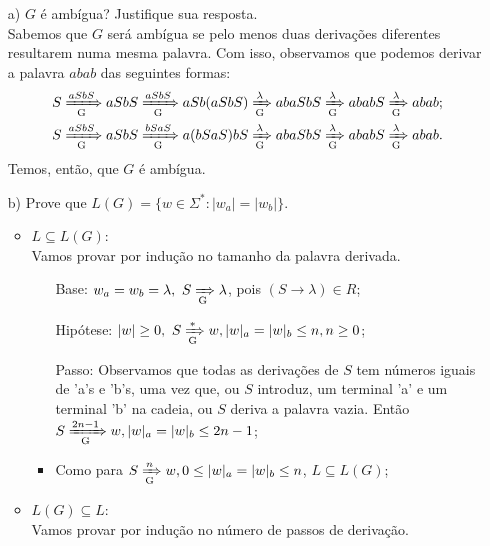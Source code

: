 \documentclass{homework}
\begin{document}
\pagebreak		
		
	\begin{enumerate}
		\item[a)] $G$ é ambígua? Justifique sua resposta.\\
		Sabemos que $G$ será ambígua se pelo menos duas derivações diferentes resultarem numa mesma palavra. Com isso, observamos que podemos derivar a palavra $abab$ das seguintes formas:
		\begin{align*}
			S & \xRightarrow[\text{G}]{aSbS} aSbS \xRightarrow[\text{G}]{aSbS} aSb(aSbS) \xRightarrow[\text{G}]{\lambda} abaSbS \xRightarrow[\text{G}]{\lambda} ababS \xRightarrow[\text{G}]{\lambda} abab;\\
			S & \xRightarrow[\text{G}]{aSbS} aSbS \xRightarrow[\text{G}]{bSaS} a(bSaS)bS \xRightarrow[\text{G}]{\lambda} abaSbS \xRightarrow[\text{G}]{\lambda} ababS \xRightarrow[\text{G}]{\lambda} abab.
		\end{align*}
		Temos, então, que $G$ é ambígua.
		\item[b)] Prove que $L(G) = \{w \in \Sigma^*: |w_a| = |w_b|\}$.
			\begin{itemize}
				\item $L \subseteq L(G)$:\\
				Vamos provar por indução  no tamanho da palavra derivada. 
					\begin{itemize}
						\item[Base:] $w_a = w_b = \lambda,\ S \xRightarrow[\text{G}]{} \lambda$, pois $(S \rightarrow \lambda) \in R$;
						\item[Hipótese:]  $|w| \geq 0,\ S \xRightarrow[\text{G}]{*} w, |w|_a=|w|_b \leq n, n \geq 0$;
						\item[Passo:] Observamos que todas as derivações de $S$ tem números iguais de 'a's e 'b's, uma vez que, ou $S$ introduz, um terminal 'a' e um terminal 'b' na cadeia, ou $S$ deriva a palavra vazia. Então $S \xRightarrow[\text{G}]{2n-1} w, |w|_a=|w|_b \leq 2n - 1$;
						\item Como para $S \xRightarrow[\text{G}]{n} w, 0 \leq |w|_a=|w|_b \leq n$, $L \subseteq L(G)$;
					\end{itemize}
				\item $L(G) \subseteq L$:\\
				Vamos provar por indução no número de passos de derivação.

\end{itemize}
\end{enumerate}
\end{document}
